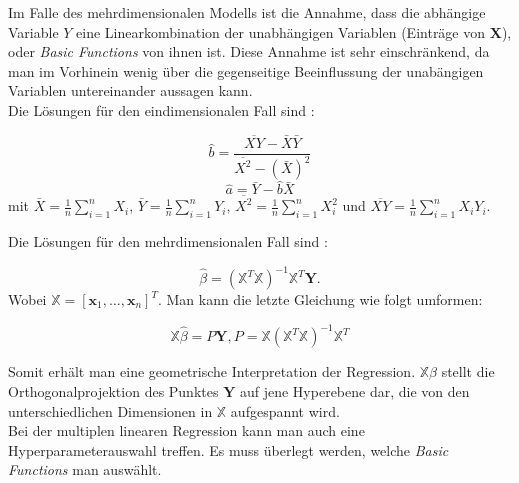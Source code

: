 Im Falle des mehrdimensionalen Modells ist die Annahme, dass die \glqq abh\"angige\grqq{} Variable $Y$ eine Linearkombination der \glqq unabh\"angigen\grqq{} Variablen
(Eintr\"age von $\mathbf{X}$), oder \textit{Basic Functions} von ihnen ist. Diese Annahme ist sehr einschr\"ankend, da man im Vorhinein wenig \"uber die gegenseitige Beeinflussung der
\glqq unab\"angigen\grqq{} Variablen untereinander aussagen kann. \\

Die L\"osungen f\"ur den eindimensionalen Fall sind \cite[Kapitel 13, Satz 13.4]{wasserman}:

$$ \hat{b} = \frac{\overline{XY} - \bar{X}\bar{Y}}{\overline{X^2} - (\bar{X})^2} $$
$$ \hat{a} = \bar{Y} - \hat{b}\bar{X} $$
mit $\bar{X} = \frac{1}{n} \sum_{i = 1}^n X_i$, $\bar{Y} = \frac{1}{n} \sum_{i = 1}^n Y_i$, $\overline{X^2} = \frac{1}{n} \sum_{i = 1}^n X_i^2$ und $\overline{XY} = \frac{1}{n} \sum_{i = 1}^n X_iY_i$.

Die L\"osungen f\"ur den mehrdimensionalen Fall sind \cite[Kapitel 13, Satz 13.13]{wasserman}:

$$  \hat{\beta} = (\mathbb{X}^T\mathbb{X})^{-1}\mathbb{X}^T\mathbf{Y} .$$
Wobei $\mathbb{X} = [\mathbf{x}_1, \dots, \mathbf{x}_n]^T$. Man kann die letzte Gleichung wie folgt umformen:

$$ \mathbb{X}\hat{\beta} = P\mathbf{Y}, P = \mathbb{X}(\mathbb{X}^T\mathbb{X})^{-1}\mathbb{X}^T $$

Somit erh\"alt man eine geometrische Interpretation der Regression. $\mathbb{X}\hat{\beta}$ stellt die Orthogonalprojektion des Punktes $\mathbf{Y}$ auf jene
Hyperebene dar, die von den unterschiedlichen Dimensionen in $\mathbb{X}$ aufgespannt wird. \\

Bei der multiplen linearen Regression kann man auch eine Hyperparameterauswahl treffen. Es muss \"uberlegt werden, welche
\textit{Basic Functions} man ausw\"ahlt.






























